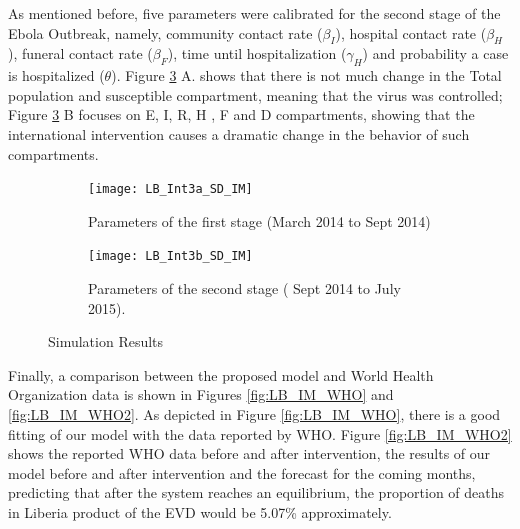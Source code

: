\noindent As mentioned before, five parameters were calibrated for the second stage of the Ebola Outbreak, namely, community contact rate ($\beta_I$), hospital contact rate ($\beta_H$), funeral contact rate ($\beta_F$), time until hospitalization ($\gamma_H$) and probability a case is hospitalized ($\theta$). Figure \ref{fig:LB_IM_In} A. shows that there is not much change in the Total population and susceptible compartment, meaning that the virus was controlled;  Figure \ref{fig:LB_IM_In} B focuses on E, I, R, H , F and D compartments, showing that the international intervention causes a dramatic change in the behavior of such compartments.


\begin{figure}[h!]
 \centering 
 \begin{subfigure}[b]{1\textwidth}
  \texttt{[image: LB\_Int3a\_SD\_IM]} \caption{ Parameters of the first stage (March 2014  to Sept 2014)} \label{fig:LB_IM_In1} \end{subfigure}
 \hspace{.1cm}
\begin{subfigure}[b]{1\textwidth}
 \texttt{[image: LB\_Int3b\_SD\_IM]} \caption{ Parameters of the second stage ( Sept 2014 to July 2015).} \label{fig:LB_IM_In2} \end{subfigure} \caption{Simulation Results}
\label{fig:LB_IM_In} 
\end{figure}






\noindent Finally, a comparison between the proposed model and World Health Organization data is shown in Figures \ref{fig:LB_IM_WHO} and \ref{fig:LB_IM_WHO2}. As depicted in Figure \ref{fig:LB_IM_WHO}, there is a good fitting of our model with the data reported by WHO. Figure \ref{fig:LB_IM_WHO2} shows  the reported WHO data before and after intervention, the results of our model before and after intervention and the forecast for the coming months, predicting that after the system reaches an equilibrium, the proportion of deaths in Liberia product of the EVD would be 5.07\% approximately.



